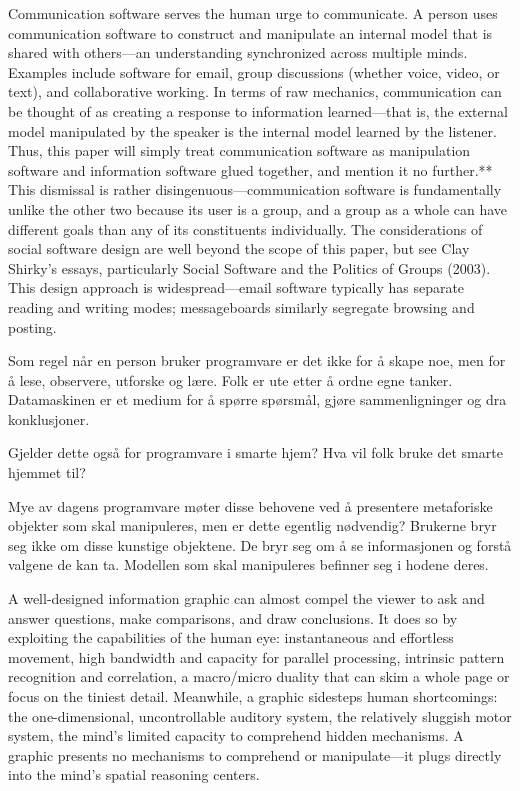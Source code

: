 {Communication software serves the human urge to communicate. A person uses communication software to construct and manipulate an internal model that is shared with others—an understanding synchronized across multiple minds. Examples include software for email, group discussions (whether voice, video, or text), and collaborative working. In terms of raw mechanics, communication can be thought of as creating a response to information learned—that is, the external model manipulated by the speaker is the internal model learned by the listener. Thus, this paper will simply treat communication software as manipulation software and information software glued together, and mention it no further.** This dismissal is rather disingenuous—communication software is fundamentally unlike the other two because its user is a group, and a group as a whole can have different goals than any of its constituents individually. The considerations of social software design are well beyond the scope of this paper, but see Clay Shirky’s essays, particularly Social Software and the Politics of Groups (2003). This design approach is widespread—email software typically has separate reading and writing modes; messageboards similarly segregate browsing and posting.

Som regel når en person bruker programvare er det ikke for å skape noe, men for å lese, observere, utforske og lære. Folk er ute etter å ordne egne tanker. Datamaskinen er et medium for å spørre spørsmål, gjøre sammenligninger og dra konklusjoner.

Gjelder dette også for programvare i smarte hjem? Hva vil folk bruke det smarte hjemmet til?

Mye av dagens programvare møter disse behovene ved å presentere metaforiske objekter som skal manipuleres, men er dette egentlig nødvendig? Brukerne bryr seg ikke om disse kunstige objektene. De bryr seg om å se informasjonen og forstå valgene de kan ta. Modellen som skal manipuleres befinner seg i hodene deres.

A well-designed information graphic can almost compel the viewer to ask and answer questions, make comparisons, and draw conclusions. It does so by exploiting the capabilities of the human eye: instantaneous and effortless movement, high bandwidth and capacity for parallel processing, intrinsic pattern recognition and correlation, a macro/micro duality that can skim a whole page or focus on the tiniest detail. Meanwhile, a graphic sidesteps human shortcomings: the one-dimensional, uncontrollable auditory system, the relatively sluggish motor system, the mind’s limited capacity to comprehend hidden mechanisms. A graphic presents no mechanisms to comprehend or manipulate—it plugs directly into the mind’s spatial reasoning centers.

}
